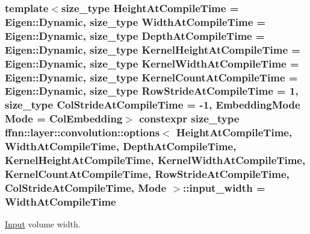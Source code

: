 \hypertarget{structffnn_1_1layer_1_1convolution_1_1options_a17abc9ea9d41cf399fbeae5e3f7580f4}{
\subsubsection[{input\-\_\-width}]{\setlength{\rightskip}{0pt plus 5cm}template$<$size\-\_\-type Height\-At\-Compile\-Time = Eigen\-::\-Dynamic, size\-\_\-type Width\-At\-Compile\-Time = Eigen\-::\-Dynamic, size\-\_\-type Depth\-At\-Compile\-Time = Eigen\-::\-Dynamic, size\-\_\-type Kernel\-Height\-At\-Compile\-Time = Eigen\-::\-Dynamic, size\-\_\-type Kernel\-Width\-At\-Compile\-Time = Eigen\-::\-Dynamic, size\-\_\-type Kernel\-Count\-At\-Compile\-Time = Eigen\-::\-Dynamic, size\-\_\-type Row\-Stride\-At\-Compile\-Time = 1, size\-\_\-type Col\-Stride\-At\-Compile\-Time = -\/1, Embedding\-Mode Mode = Col\-Embedding$>$ constexpr {\bf size\-\_\-type} {\bf ffnn\-::layer\-::convolution\-::options}$<$ Height\-At\-Compile\-Time, Width\-At\-Compile\-Time, Depth\-At\-Compile\-Time, Kernel\-Height\-At\-Compile\-Time, Kernel\-Width\-At\-Compile\-Time, Kernel\-Count\-At\-Compile\-Time, Row\-Stride\-At\-Compile\-Time, Col\-Stride\-At\-Compile\-Time, Mode $>$\-::input\-\_\-width = Width\-At\-Compile\-Time\hspace{0.3cm}{\ttfamily [static]}}}\label{structffnn_1_1layer_1_1convolution_1_1options_a17abc9ea9d41cf399fbeae5e3f7580f4}


\hyperlink{classffnn_1_1layer_1_1_input}{Input} volume width. 

